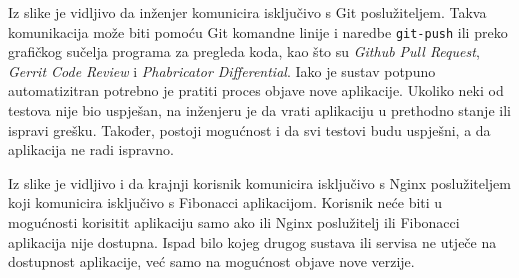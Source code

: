 Iz slike je vidljivo da inženjer komunicira isključivo s Git poslužiteljem. Takva komunikacija može
biti pomoću Git komandne linije i naredbe \texttt{git-push} ili preko grafičkog sučelja programa za
pregleda koda, kao što su \textit{Github Pull Request}, \textit{Gerrit Code Review} i
\textit{Phabricator Differential}. Iako je sustav potpuno automatizitran potrebno je pratiti proces
objave nove aplikacije. Ukoliko neki od testova nije bio uspješan, na inženjeru je da vrati
aplikaciju u prethodno stanje ili ispravi grešku. Također, postoji mogućnost i da svi testovi budu
uspješni, a da aplikacija ne radi ispravno.

Iz slike je vidljivo i da krajnji korisnik komunicira isključivo s Nginx poslužiteljem koji
komunicira isključivo s Fibonacci aplikacijom. Korisnik neće biti u mogućnosti korisitit aplikaciju
samo ako ili Nginx poslužitelj ili Fibonacci aplikacija nije dostupna. Ispad bilo kojeg drugog
sustava ili servisa ne utječe na dostupnost aplikacije, već samo na mogućnost objave nove verzije.
